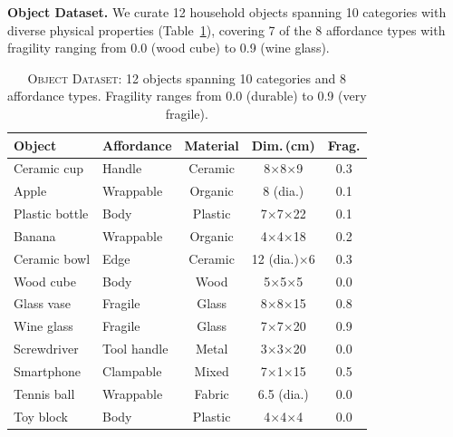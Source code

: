 \documentclass[letterpaper, 10pt, conference]{ieeeconf}
\begin{document}
\textbf{Object Dataset.}
We curate 12 household objects spanning 10 categories with diverse physical properties (Table~\ref{tab:objects}), covering 7 of the 8 affordance types with fragility ranging from 0.0 (wood cube) to 0.9 (wine glass).

\begin{table}[t]
\centering
\caption{\textsc{Object Dataset}: 12 objects spanning 10 categories and 8 affordance types. Fragility ranges from 0.0 (durable) to 0.9 (very fragile).}
\label{tab:objects}
\renewcommand{\arraystretch}{1.05}
\setlength{\tabcolsep}{2pt}
\begin{tabular}{@{}llccc@{}}
\toprule
\textbf{Object} & \textbf{Affordance} & \textbf{Material} & \textbf{Dim.\,(cm)} & \textbf{Frag.} \\
\midrule
Ceramic cup & Handle & Ceramic & 8$\times$8$\times$9 & 0.3 \\
Apple & Wrappable & Organic & 8 (dia.) & 0.1 \\
Plastic bottle & Body & Plastic & 7$\times$7$\times$22 & 0.1 \\
Banana & Wrappable & Organic & 4$\times$4$\times$18 & 0.2 \\
Ceramic bowl & Edge & Ceramic & 12 (dia.)$\times$6 & 0.3 \\
Wood cube & Body & Wood & 5$\times$5$\times$5 & 0.0 \\
Glass vase & Fragile & Glass & 8$\times$8$\times$15 & 0.8 \\
Wine glass & Fragile & Glass & 7$\times$7$\times$20 & 0.9 \\
Screwdriver & Tool handle & Metal & 3$\times$3$\times$20 & 0.0 \\
Smartphone & Clampable & Mixed & 7$\times$1$\times$15 & 0.5 \\
Tennis ball & Wrappable & Fabric & 6.5 (dia.) & 0.0 \\
Toy block & Body & Plastic & 4$\times$4$\times$4 & 0.0 \\
\bottomrule
\end{tabular}
\end{table}
\end{document}
